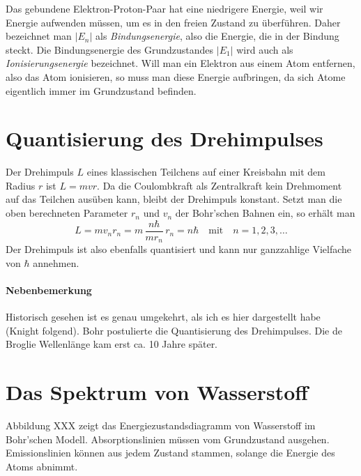Das gebundene Elektron-Proton-Paar hat eine niedrigere Energie, weil wir Energie aufwenden müssen, um es in den freien Zustand zu überführen. Daher bezeichnet man $|E_n|$ als \emph{Bindungsenergie}, also die Energie, die in der Bindung steckt. Die Bindungsenergie des Grundzustandes $|E_1|$ wird auch als \emph{Ionisierungsenergie} bezeichnet. Will man ein Elektron aus einem Atom entfernen, also das Atom ionisieren, so muss man diese Energie aufbringen, da sich Atome eigentlich immer im Grundzustand befinden. 


\section{Quantisierung des Drehimpulses}

Der Drehimpuls $L$ eines klassischen Teilchens auf einer Kreisbahn mit dem Radius $r$ ist $L = m v r$.
Da die Coulombkraft als Zentralkraft kein Drehmoment auf das Teilchen ausüben kann, bleibt der Drehimpuls konstant. Setzt man die oben berechneten Parameter $r_n$ und $v_n$ der Bohr'schen Bahnen ein, so erhält man
\begin{equation}
    L = m v_n r_n = m  \, \frac{n \hbar}{m r_n} \, r_n = n \hbar \quad \text{mit} \quad n = 1, 2, 3, \dots
\end{equation}
Der Drehimpuls ist also ebenfalls quantisiert und kann nur ganzzahlige Vielfache von $\hbar$ annehmen.

\paragraph*{Nebenbemerkung} Historisch gesehen ist es genau umgekehrt, als ich es hier dargestellt habe (Knight folgend). Bohr postulierte die Quantisierung des Drehimpulses. Die de Broglie Wellenlänge kam erst ca. 10 Jahre später.


\section{Das Spektrum von Wasserstoff}

Abbildung XXX zeigt das Energiezustandsdiagramm von Wasserstoff im Bohr'schen Modell. Absorptionslinien müssen vom Grundzustand ausgehen. Emissionslinien können aus jedem Zustand stammen, solange die Energie des Atoms abnimmt.

